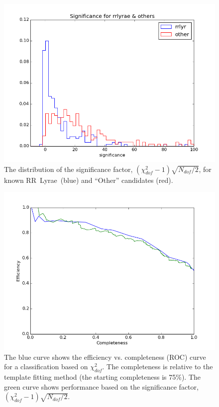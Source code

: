 \documentclass[12pt, preprint]{aastex}
\def\RR  {\hbox{RR Lyrae}}
\begin{document}
\begin{figure}[!t]
\hskip 0.4in
\includegraphics[width=0.9\hsize,clip]{significance.png}
\caption{The distribution of the significance factor, $(\chi^2_{dof}-1) \sqrt{N_{dof}/2}$, for 
known \RR\ (blue) and ``Other'' candidates (red).} 
\label{Fig:sign}
\end{figure}



\begin{figure}[!t]
\hskip 0.4in
\includegraphics[width=0.9\hsize,clip]{ROC.png}
\caption{The blue curve shows the efficiency vs. completeness (ROC) curve for a classification based 
on $\chi^2_{dof}$. The completeness is relative to the template fitting method (the starting completeness 
is 75\%). The green curve shows performance based on the significance factor, $(\chi^2_{dof}-1) \sqrt{N_{dof}/2}$.} 
\label{Fig:ROC}
\end{figure}
\end{document}
